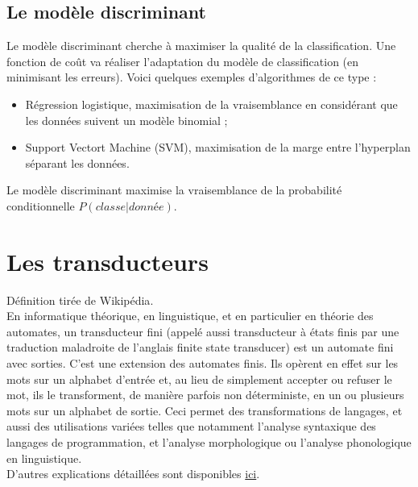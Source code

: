     \subsection{Le modèle discriminant}
    \label{annexe:discriminatif}
        Le modèle discriminant cherche à maximiser la qualité de la classification. Une fonction de coût va réaliser l'adaptation du modèle de classification (en minimisant les erreurs). Voici quelques exemples d'algorithmes de ce type :
        \begin{itemize}
            \item Régression logistique, maximisation de la vraisemblance en considérant que les données suivent un modèle binomial ;
            \item Support Vectort Machine (SVM), maximisation de la marge entre l'hyperplan séparant les données.
        \end{itemize}
        Le modèle discriminant maximise la vraisemblance de la probabilité conditionnelle $P(classe | donnée)$.

\section{Les transducteurs}
\label{annexe:transducteurs}
    Définition tirée de Wikipédia\autocite{wiki_trans}.\\

    En informatique théorique, en linguistique, et en particulier en théorie des automates, un transducteur fini (appelé aussi transducteur à états finis par une traduction maladroite de l'anglais finite state transducer) est un automate fini avec sorties. C'est une extension des automates finis. Ils opèrent en effet sur les mots sur un alphabet d'entrée et, au lieu de simplement accepter ou refuser le mot, ils le transforment, de manière parfois non déterministe, en un ou plusieurs mots sur un alphabet de sortie. Ceci permet des transformations de langages, et aussi des utilisations variées telles que notamment l'analyse syntaxique des langages de programmation, et l'analyse morphologique ou l'analyse phonologique en linguistique.\\

    D'autres explications détaillées sont disponibles \href{http://sixty-north.com/blog/deriving-transducers-from-first-pr}{ici}.